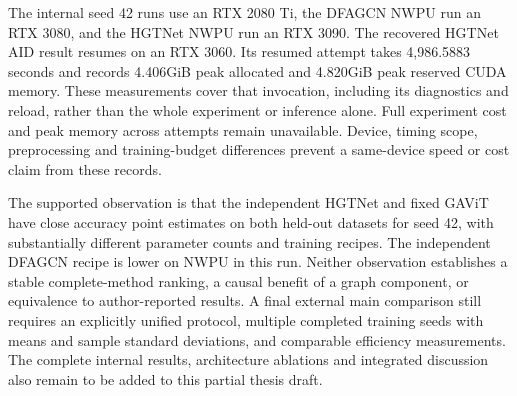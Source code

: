 The internal seed 42 runs use an RTX 2080 Ti, the DFAGCN NWPU run an RTX 3080,
and the HGTNet NWPU run an RTX 3090. The recovered HGTNet AID result resumes
on an RTX 3060. Its resumed attempt takes 4,986.5883 seconds and records
4.406GiB peak allocated and 4.820GiB peak reserved CUDA memory. These
measurements cover that invocation, including its diagnostics and reload,
rather than the whole experiment or inference alone. Full experiment cost
and peak memory across attempts remain unavailable. Device, timing scope,
preprocessing and training-budget differences prevent a same-device speed
or cost claim from these records.

The supported observation is that the independent HGTNet and fixed GAViT
have close accuracy point estimates on both held-out datasets for seed 42,
with substantially different parameter counts and training recipes.
The independent DFAGCN recipe is lower on NWPU in this run. Neither
observation establishes a stable complete-method ranking, a causal benefit
of a graph component, or equivalence to author-reported results. A final
external main comparison still requires an explicitly unified protocol,
multiple completed training seeds with means and sample standard deviations,
and comparable efficiency measurements. The complete internal results,
architecture ablations and integrated discussion also remain to be added
to this partial thesis draft.
